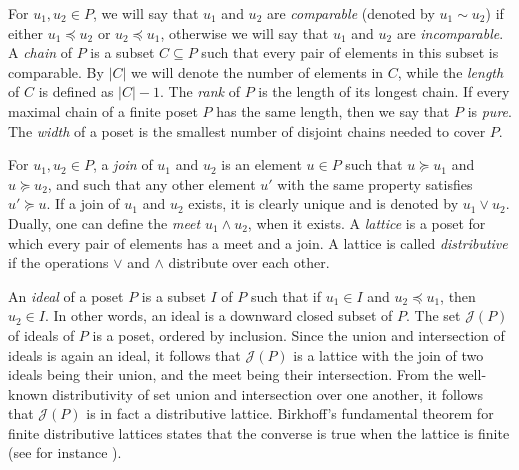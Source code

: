 \documentclass[12pt]{amsart}
\numberwithin{equation}{section}
\theoremstyle{definition}
\begin{document}
For $u_1, u_2 \in P$, we will say that $u_1$ and $u_2$ are \emph{comparable} (denoted by $u_1\sim u_2$) if either  $u_1\preceq u_2$ or $u_2\preceq u_1$, otherwise we will say that $u_1$ and $u_2$ are \emph{incomparable}. A \emph{chain} of $P$ is a subset $C\subseteq P$ such that every pair of elements in this subset is comparable. By $|C|$ we will denote the number of elements in $C$, while the \emph{length} of $C$ is defined as $|C|-1$. The \emph{rank} of $P$ is the length of its longest chain. If every maximal chain of a finite poset $P$ has the same length, then we say that $P$ is \textit{pure}. The \textit{width} of a poset is the smallest number of disjoint chains needed to cover $P$.

For $u_1, u_2 \in P$, a \emph{join} of $u_1$ and $u_2$ is an element $u\in P$ such that $u\succeq u_1$ and $u\succeq u_2$, and such that any other element $u'$ with the same property satisfies $u'\succeq u$. If a join of $u_1$ and $u_2$ exists, it is clearly unique and is denoted by $u_1\vee u_2$.  Dually, one can define the \textit{meet} $u_1\wedge u_2$, when it exists. A \textit{lattice}
is a poset for which every pair of elements has a meet and a join. A lattice is called \emph{distributive} if the operations $\vee$ and $\wedge$ distribute over each other.

An \emph{ideal} of a poset $P$ is a subset $I$ of $P$ such that if $u_1 \in I$ and $u_2\preceq u_1$, then $u_2 \in I$. In other words, an ideal is a downward closed subset of $P$. The set $\mathcal{J}(P)$ of ideals of $P$ is a poset, ordered by inclusion. Since the union and intersection of ideals is again an ideal, it follows that $\mathcal{J}(P)$ is a lattice with the join of two ideals being their union, and the meet being their intersection. From the well-known distributivity of set union and intersection over
one another, it follows that $\mathcal{J}(P)$ is in fact a distributive lattice. 
Birkhoff's fundamental theorem for finite distributive lattices states that the converse is true when the lattice is finite (see for instance \cite[Theorem 3.4.1]{Stn}). 
\end{document}
